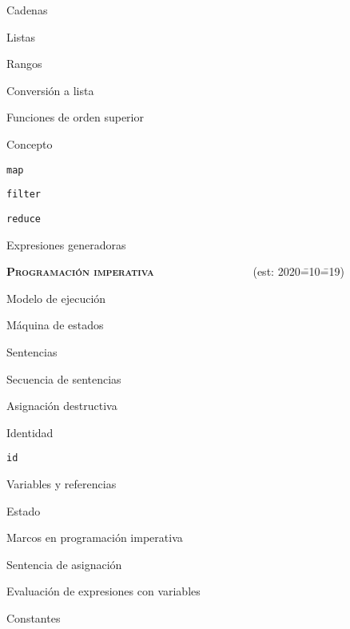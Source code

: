 \begin{longenum}
\begin{longenum}
\begin{longenum}
            \item Cadenas
            \item Listas
            \item Rangos
            \item Conversión a lista
        \end{longenum}
        \item Funciones de orden superior
        \begin{longenum}
            \item Concepto
            \item \texttt{map}
            \item \texttt{filter}
            \item \texttt{reduce}
            \item Expresiones generadoras
        \end{longenum}
    \end{longenum}
    \item \textbf{\textsc{Programación imperativa}} \ \ \ \ \ \ \ \ \ \ \ \ \ \ \ \ \ (est: 2020\==10\==19)
    \begin{longenum}
        \item Modelo de ejecución
        \begin{longenum}
            \item Máquina de estados
            \item Sentencias
            \item Secuencia de sentencias
        \end{longenum}
        \item Asignación destructiva
        \begin{longenum}
            \item Identidad
            \begin{longenum}
                \item \texttt{id}
            \end{longenum}
            \item Variables y referencias
            \item Estado
            \item Marcos en programación imperativa
            \item Sentencia de asignación
            \item Evaluación de expresiones con variables
            \item Constantes

\end{longenum}
\end{longenum}
\end{longenum}
